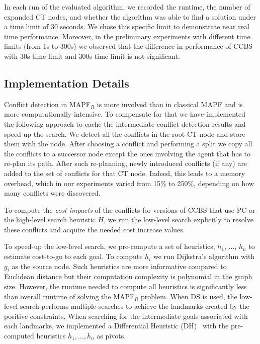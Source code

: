 \documentclass[letterpaper]{article} %
\newcommand{\ccbs}{\ac{CCBS}\xspace}
\newcommand{\ct}{\ac{CT}\xspace}
\newcommand{\mapfr}{{MAPF}$_R$\xspace}
\newcommand{\mapf}{\ac{MAPF}\xspace}
\newcommand{\pc}{\ac{PC}\xspace}
\newcommand{\ds}{\ac{DS}\xspace}
\begin{document}
In each run of the evaluated algorithm, we recorded the runtime, the number of expanded \ct nodes, and whether the algorithm was able to find a solution under a time limit of 30 seconds. We chose this specific limit to demonstrate near real time performance. Moreover, in the preliminary experiments with different time limits (from 1s to 300s) we observed that the difference in performance of \ccbs with 30s time limit and 300s time limit is not significant. 

\subsection{Implementation Details}

Conflict detection in \mapfr is more involved than in classical \mapf and is more computationally intensive. 
To compensate for that we have implemented the following approach to cache the intermediate conflict detection results and speed up the search. 
We detect all the conflicts in the root \ct node and store them with the node. 
After choosing a conflict and performing a split we copy all the conflicts to a successor node except the ones involving the agent that has to re-plan its path. 
After such re-planning, newly introduced conflicts (if any) are added to the set of conflicts for that \ct node. Indeed, this leads to a memory overhead, which in our experiments varied from 15\% to 250\%, depending on how many conflicts were discovered. 

To compute the \emph{cost impacts} of the conflicts for versions of \ccbs that use \pc or the high-level search heuristic $H$, we run the low-level search explicitly to resolve these conflicts and acquire the needed cost increase values.

To speed-up the low-level search, we pre-compute a set of heuristics, $h_1$, ..., $h_n$ to estimate cost-to-go to each goal. 
To compute $h_i$ we run Dijkstra's algorithm with $g_i$ as the source node. Such heuristics are more informative compared to Euclidean distance but their computation complexity is polynomial in the graph size. However, the runtime needed to compute all heuristics is significantly less than overall runtime of solving the \mapfr problem.
When \ds is used, the low-level search performs multiple searches to achieve the landmarks created by the positive constraints. When searching for the intermediate goals associated with each landmarks, we implemented a Differential Heuristic (DH)~\cite{goldenberg2011compressed} with the pre-computed heuristics $h_1,\ldots, h_n$ as pivots.
\end{document}

